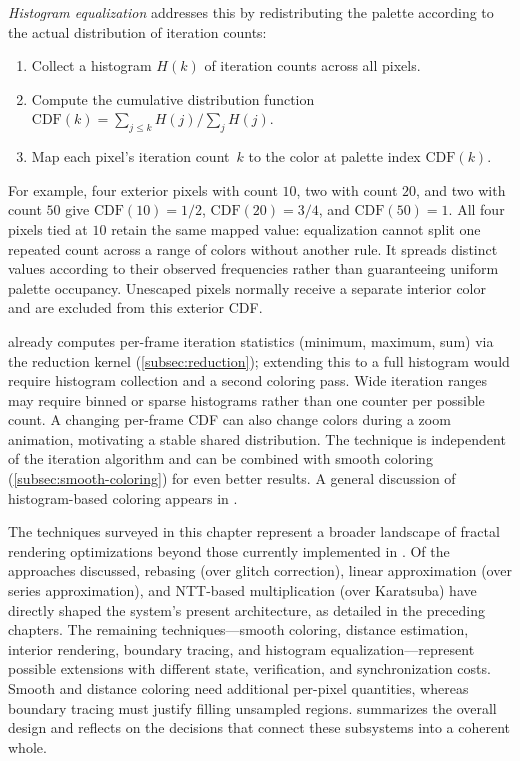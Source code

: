 \emph{Histogram equalization} addresses this by redistributing the
palette according to the actual distribution of iteration counts:
\begin{enumerate}
  \item Collect a histogram $H(k)$ of iteration counts across all
        pixels.
  \item Compute the cumulative distribution function
        $\mathrm{CDF}(k) = \sum_{j \le k} H(j) \big/ \sum_j H(j)$.
  \item Map each pixel's iteration count~$k$ to the color at palette
        index $\mathrm{CDF}(k)$.
\end{enumerate}
For example, four exterior pixels with count $10$, two with count $20$, and
two with count $50$ give $\mathrm{CDF}(10)=1/2$,
$\mathrm{CDF}(20)=3/4$, and $\mathrm{CDF}(50)=1$.
All four pixels tied at $10$ retain the same mapped value: equalization cannot
split one repeated count across a range of colors without another rule.
It spreads distinct values according to their observed frequencies rather
than guaranteeing uniform palette occupancy.  Unescaped pixels normally
receive a separate interior color and are excluded from this exterior CDF.

\FractalShark{} already computes per-frame iteration statistics
(minimum, maximum, sum) via the reduction kernel
(\cref{subsec:reduction}); extending this to a full histogram would
require histogram collection and a second coloring pass.  Wide iteration
ranges may require binned or sparse histograms rather than one counter per
possible count.  A changing per-frame CDF can also change colors during a
zoom animation, motivating a stable shared distribution.  The technique is
independent of the iteration algorithm and can be combined
with smooth coloring (\cref{subsec:smooth-coloring}) for even better
results.  A general discussion of histogram-based coloring appears in
\cite{WikipediaPlottingAlgorithms}.

The techniques surveyed in this chapter represent a broader landscape of
fractal rendering optimizations beyond those currently implemented in
\FractalShark{}.  Of the approaches discussed, rebasing (over glitch
correction), linear approximation (over series approximation), and
NTT-based multiplication (over Karatsuba) have directly shaped the
system's present architecture, as detailed in the preceding chapters.
The remaining techniques---smooth coloring, distance estimation,
interior rendering, boundary tracing, and histogram
equalization---represent possible extensions with different state,
verification, and synchronization costs.  Smooth and distance coloring need
additional per-pixel quantities, whereas boundary tracing must justify filling
unsampled regions.
 summarizes the overall design and reflects on the
decisions that connect these subsystems into a coherent whole.
